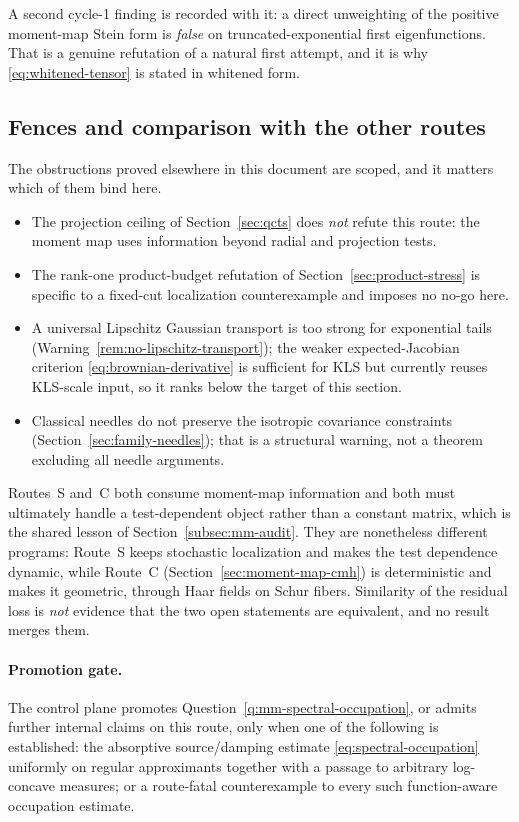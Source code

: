 \documentclass[../../main.tex]{subfiles}
\begin{document}
A second cycle-1 finding is recorded with it: a direct unweighting of the positive moment-map
Stein form is \emph{false} on truncated-exponential first eigenfunctions. That is a genuine
refutation of a natural first attempt, and it is why \eqref{eq:whitened-tensor} is stated in
whitened form.

\subsection{Fences and comparison with the other routes}
\label{subsec:spectral-fences}

The obstructions proved elsewhere in this document are scoped, and it matters which of them bind
here.

\begin{itemize}[leftmargin=1.6em]
  \item The projection ceiling of Section~\ref{sec:qcts} does \emph{not} refute this route: the
  moment map uses information beyond radial and projection tests.
  \item The rank-one product-budget refutation of Section~\ref{sec:product-stress} is specific to
  a fixed-cut localization counterexample and imposes no no-go here.
  \item A universal Lipschitz Gaussian transport is too strong for exponential tails
  (Warning~\ref{rem:no-lipschitz-transport}); the weaker expected-Jacobian criterion
  \eqref{eq:brownian-derivative} is sufficient for KLS but currently reuses KLS-scale input, so
  it ranks below the target of this section.
  \item Classical needles do not preserve the isotropic covariance constraints
  (Section~\ref{sec:family-needles}); that is a structural warning, not a theorem excluding all
  needle arguments.
\end{itemize}

\begin{remark}
\label{rem:spectral-vs-cmh}
Routes~S and~C both consume moment-map information and both must ultimately handle a
test-dependent object rather than a constant matrix, which is the shared lesson of
Section~\ref{subsec:mm-audit}. They are nonetheless different programs: Route~S keeps stochastic
localization and makes the test dependence dynamic, while Route~C
(Section~\ref{sec:moment-map-cmh}) is deterministic and makes it geometric, through Haar fields on
Schur fibers. Similarity of the residual loss is \emph{not} evidence that the two open statements
are equivalent, and no result merges them.
\end{remark}

\paragraph{Promotion gate.}
The control plane promotes Question~\ref{q:mm-spectral-occupation}, or admits further internal
claims on this route, only when one of the following is established: the absorptive
source/damping estimate \eqref{eq:spectral-occupation} uniformly on regular approximants together
with a passage to arbitrary log-concave measures; or a route-fatal counterexample to every such
function-aware occupation estimate.
\end{document}
